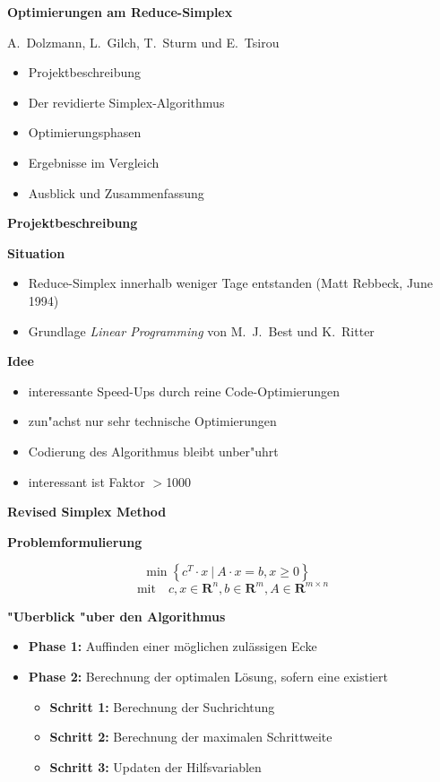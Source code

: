 \documentclass[slidesonly]{seminar}
\newcommand{\scaption}[1]{\centerline{\textbf{\large #1}}\medskip}
\newcommand{\header}[1]{\par\medskip\textbf{\large #1}\par}
\begin{document}
%
\begin{slide}
\centerline{\Large\textbf{Optimierungen am Reduce-Simplex}}
\bigskip

\centerline{A.~Dolzmann, L.~Gilch, T.~Sturm und E.~Tsirou}
\vspace{1cm}

\begin{itemize}
\item Projektbeschreibung
\item Der revidierte Simplex-Algorithmus
\item Optimierungsphasen
\item Ergebnisse im Vergleich
\item Ausblick und Zusammenfassung
\end{itemize}
\end{slide}
%
\begin{slide}
\scaption{Projektbeschreibung}
\header{Situation}
\begin{itemize}
\item Reduce-Simplex innerhalb weniger Tage entstanden (Matt Rebbeck,
June 1994)
\item Grundlage \emph{Linear Programming} von M.~J.~Best und K.~Ritter
\end{itemize}
\header{Idee}
\begin{itemize}
\item interessante Speed-Ups durch reine Code-Optimierungen
\item zun"achst nur sehr technische Optimierungen
\item Codierung des Algorithmus bleibt unber"uhrt
\item interessant ist Faktor $>$1000
\end{itemize}
\end{slide}
%
\begin{slide}
\scaption{Revised Simplex Method}
\header{Problemformulierung}
\begin{displaymath}
\min\left\{ c^{T}\cdot x \ \big| \ A\cdot x = b, x \geq 0\right\} \quad 
\end{displaymath}
\begin{displaymath}
\textrm{mit} \quad c,x \in \mathbf{R}^{n}, b \in \mathbf{R}^{m}, A\in \mathbf{R}^{m \times n}
\end{displaymath}
\end{slide}
\begin{slide}
\header{"Uberblick "uber den Algorithmus}
\begin{itemize}
\item \textbf{Phase 1:} Auffinden einer m\"oglichen zul\"assigen Ecke
\item \textbf{Phase 2:} Berechnung der optimalen L\"osung, sofern eine existiert
\begin{itemize}
\item \textbf{Schritt 1:} Berechnung der Suchrichtung
\item \textbf{Schritt 2:} Berechnung der maximalen Schrittweite
\item \textbf{Schritt 3:} Updaten der Hilfsvariablen
\end{itemize}
\end{itemize}
\end{slide}
\end{document}

